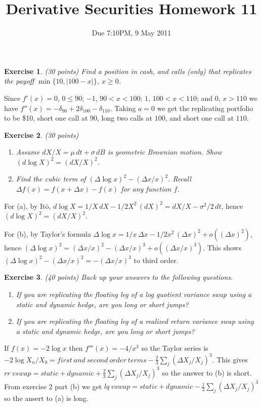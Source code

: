 \documentclass[11pt,fleqn]{amsproc}
\newtheorem{xca}{Exercise}
\begin{document}
\title{Derivative Securities Homework 11}
\author{Due 7:10PM, 9 May 2011}

\maketitle

\begin{xca}{(30 points)}
Find a position in cash, and calls (only) that
replicates the payoff $\min\{10, |100 - x|\}$, $x\ge0$.
\end{xca}

Since $f'(x) = 0$, $0\le 90$; $-1$, $90 < x < 100$; $1$, $100 < x <
110$; and $0$, $x > 110$ we have $f''(x) = -\delta_{90} + 2\delta_{100}
- \delta_{110}$. Taking $a = 0$ we get the replicating portfolio
to be \$10, short one call at $90$, long two calls at $100$, and
short one call at $110$.

\begin{xca}{(30 points)}
\begin{enumerate}
\item
Assume $dX/X = \mu\,dt + \sigma\,dB$ is geometric Brownian motion.
Show $(d\log X)^2 = (dX/X)^2$.
\item Find the cubic term of $(\Delta\log x)^2 - (\Delta x/x)^2$.
Recall $\Delta f(x) = f(x + \Delta x) - f(x)$ for any function $f$.
\end{enumerate}
\end{xca}

For (a), by It\=o, $d\log X = 1/X\,dX - 1/2X^2\,(dX)^2 = dX/X - \sigma^2/2\,dt$,
hence $(d\log X)^2 = (dX/X)^2$.

For (b), by Taylor's formula $\Delta\log x = 1/x\,\Delta x -
1/2x^2\,(\Delta x)^2 + o((\Delta x)^2)$, hence $(\Delta\log x)^2
= (\Delta x/x)^2 - (\Delta x/x)^3 + o((\Delta x/x)^3)$.
This shows $(\Delta\log x)^2 - (\Delta x/x)^2 = -(\Delta x/x)^3$ to
third order.

\begin{xca}{(40 points)}
Back up your answers to the following questions.
\begin{enumerate}
\item If you are replicating the floating leg of a log quotient
variance swap using a static and dynamic hedge, are you long
or short jumps?
\item If you are replicating the floating leg of a realized return
variance swap using a static and dynamic hedge, are you long
or short jumps?
\end{enumerate}
\end{xca}

If $f(x) = -2\log x$ then $f'''(x) = -4/x^3$ so the Taylor series is
$-2\log X_n/X_0 = first\ and\ second\ order\ terms -\frac{2}{3}\sum_j (\Delta
X_j/X_j)^3$. This gives $rr\ vswap = static + dynamic + \frac{2}{3}\sum_j
(\Delta X_j/X_j)^3$ so the answer to (b) is short. From exercise 2
part (b) we get $lq\ vswap =  static + dynamic - \frac{1}{3}\sum_j
(\Delta X_j/X_j)^3$ so the ansert to (a) is long.
\end{document}
